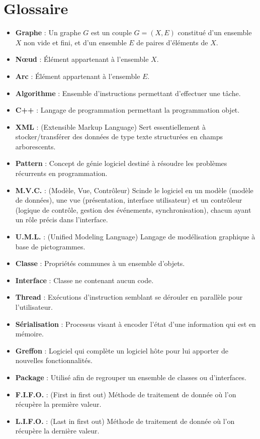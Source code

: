 \documentclass[11pt,a4paper]{article}
\begin{document}
	\section*{Glossaire}
	\begin{itemize}
		\item \textbf{Graphe} : Un graphe $G$ est un couple $G=(X,E)$ constitué d'un ensemble $X$ non vide et fini, et d'un ensemble $E$ de paires d'éléments de $X$.
		\item \textbf{N\oe ud} : Élément appartenant à l'ensemble $X$.
		\item \textbf{Arc} : Élément appartenant à l'ensemble $E$.
		\item \textbf{Algorithme} : Ensemble d'instructions permettant d'effectuer une tâche.
		\item \textbf{C++} : Langage de programmation permettant la programmation objet.
		\item \textbf{XML} : (Extensible Markup Language) Sert essentiellement à stocker/transférer des données de type texte structurées en champs arborescents.
		\item \textbf{Pattern} : Concept de génie logiciel destiné à résoudre les problèmes récurrents en programmation.
		\item \textbf{M.V.C.} : (Modèle, Vue, Contrôleur) Scinde le logiciel en un modèle (modèle de données), une vue (présentation, interface utilisateur) et un contrôleur (logique de contrôle, gestion des événements, synchronisation), chacun ayant un rôle précis dans l'interface.
		\item \textbf{U.M.L.} : (Unified Modeling Language) Langage de modélisation graphique à base de pictogrammes.
		\item \textbf{Classe} : Propriétés communes à un ensemble d'objets.
		\item \textbf{Interface} : Classe ne contenant aucun code.
		\item \textbf{Thread} : Exécutions d'instruction semblant se dérouler en parallèle pour l'utilisateur.
		\item \textbf{Sérialisation} : Processus visant à encoder l'état d'une information qui est en mémoire.
		\item \textbf{Greffon} : Logiciel qui complète un logiciel hôte pour lui apporter de nouvelles fonctionnalités.
		\item \textbf{Package} : Utilisé afin de regrouper un ensemble de classes ou d'interfaces.
		\item \textbf{F.I.F.O.} : (First in first out) Méthode de traitement de donnée où l'on récupère la première valeur.
		\item \textbf{L.I.F.O.} : (Last in first out) Méthode de traitement de donnée où l'on récupère la dernière valeur.
	\end{itemize}	
	
\end{document}
